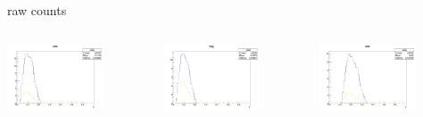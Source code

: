 \begin{frame}{raw counts}
\begin{columns}
\begin{column}[T]{0.25\textwidth}
\includegraphics[width = 0.7\textwidth]{results/yield/statistics/yield_x_Q2_z_0.50_5.000_0.40_pos.png}
\end{column}
\begin{column}[T]{0.25\textwidth}
\includegraphics[width = 0.7\textwidth]{results/yield/statistics/yield_x_Q2_z_0.50_5.000_0.40_neg.png}
\end{column}
\begin{column}[T]{0.25\textwidth}
\includegraphics[width = 0.7\textwidth]{results/yield/statistics/yield_x_Q2_z_0.50_5.000_0.50_pos.png}

\end{column}
\end{columns}
\end{frame}
